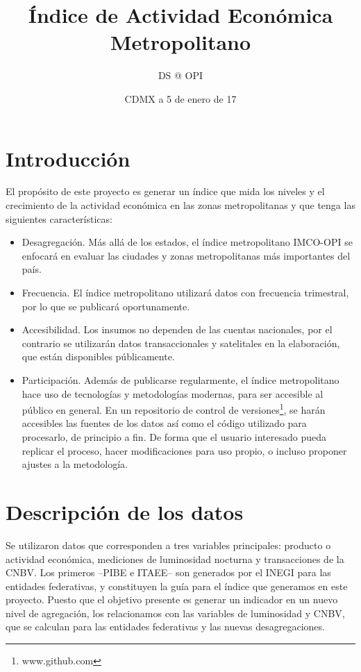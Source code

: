 \documentclass[]{article}
\title{Índice de Actividad Económica Metropolitano}
\author{DS @ OPI}
\date{CDMX a 5 de enero de 17}
\providecommand{\tightlist}{%
  \setlength{\itemsep}{0pt}\setlength{\parskip}{0pt}}
\let\rmarkdownfootnote\footnote%
\def\footnote{\protect\rmarkdownfootnote}
\begin{document}
\maketitle

\section{Introducción}\label{introduccion}

El propósito de este proyecto es generar un índice que mida los niveles
y el crecimiento de la actividad económica en las zonas metropolitanas y
que tenga las siguientes características:

\begin{itemize}
\tightlist
\item
  Desagregación. Más allá de los estados, el índice metropolitano
  IMCO-OPI se enfocará en evaluar las ciudades y zonas metropolitanas
  más importantes del país.
\item
  Frecuencia. El índice metropolitano utilizará datos con frecuencia
  trimestral, por lo que se publicará oportunamente.
\item
  Accesibilidad. Los insumos no dependen de las cuentas nacionales, por
  el contrario se utilizarán datos transaccionales y satelitales en la
  elaboración, que están disponibles públicamente.
\item
  Participación. Además de publicarse regularmente, el índice
  metropolitano hace uso de tecnologías y metodologías modernas, para
  ser accesible al público en general. En un repositorio de control de
  versiones\footnote{www.github.com}, se harán accesibles las fuentes de
  los datos así como el código utilizado para procesarlo, de principio a
  fin. De forma que el usuario interesado pueda replicar el proceso,
  hacer modificaciones para uso propio, o incluso proponer ajustes a la
  metodología.
\end{itemize}

\section{Descripción de los datos}\label{descripcion-de-los-datos}

Se utilizaron datos que corresponden a tres variables principales:
producto o actividad económica, mediciones de luminosidad nocturna y
transacciones de la CNBV. Los primeros --PIBE e ITAEE-- son generados
por el INEGI para las entidades federativas, y constituyen la guía para
el índice que generamos en este proyecto. Puesto que el objetivo
presente es generar un indicador en un nuevo nivel de agregación, los
relacionamos con las variables de luminosidad y CNBV, que se calculan
para las entidades federativas y las nuevas desagregaciones.
\end{document}
